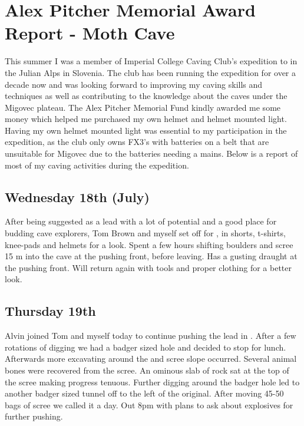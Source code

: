 \section{Alex Pitcher Memorial Award Report - Moth Cave}

This summer I was a member of Imperial College Caving Club's expedition
to  in the Julian Alps in Slovenia. The club has been
running the expedition for over a decade now and was looking forward to
improving my caving skills and techniques as well as contributing to the
knowledge about the caves under the Migovec plateau. The Alex Pitcher
Memorial Fund kindly awarded me some money which helped me purchased my
own helmet and helmet mounted light. Having my own helmet mounted light
was essential to my participation in the expedition, as the club only
owns FX3's with batteries on a belt that are unsuitable for Migovec due
to the batteries needing a mains. Below is a report of most of my caving
activities during the expedition.

\subsection{Wednesday 18th (July)}

After being suggested as a lead with a lot of potential and a good place
for budding cave explorers, Tom Brown and myself set off for ,
in shorts, t-shirts, knee-pads and helmets for a look. Spent a few hours
shifting boulders and scree 15 m into the cave at the pushing front,
before leaving. Has a gusting draught at the pushing front. Will return
again with tools and proper clothing for a better look.

\subsection{Thursday 19th}

Alvin joined Tom and myself today to continue pushing the lead in . After a few rotations of digging we had a badger sized hole and
decided to stop for lunch. Afterwards more excavating around the  and scree slope occurred. Several animal bones were recovered from
the scree. An ominous slab of rock sat at the top of the scree making
progress tenuous. Further digging around the badger hole led to another
badger sized tunnel off to the left of the original. After moving 45-50
bags of scree we called it a day. Out 8pm with plans to ask about
explosives for further pushing.

